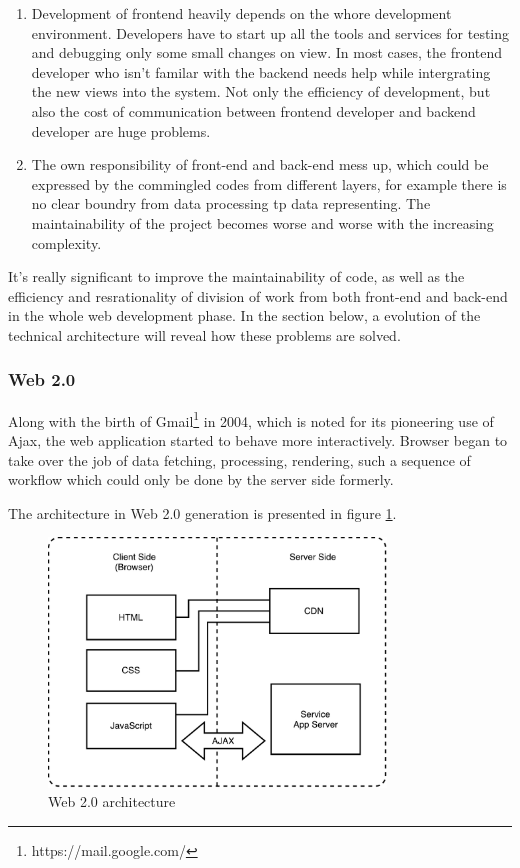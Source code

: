 \begin{enumerate}
\item
Development of frontend heavily depends on the whore development environment. Developers have to start up all the tools and services for testing and debugging only some small changes on view. In most cases, the frontend developer who isn't familar with the backend needs help while intergrating the new views into the system. Not only the efficiency of development, but also the cost of communication between frontend developer and backend developer are huge problems.
\item
The own responsibility of front-end and back-end mess up, which could be expressed by the commingled codes from different layers, for example there is no clear boundry from data processing tp data representing. The maintainability of the project becomes worse and worse with the increasing complexity.
\end{enumerate}

It's really significant to improve the maintainability of code, as well as the efficiency and resrationality of division of work from both front-end and back-end in the whole web development phase. In the section below, a evolution of the technical architecture will reveal how these problems are solved.

\subsubsection{Web 2.0}
Along with the birth of Gmail\footnote{https://mail.google.com/} in 2004, which is noted for its pioneering use of \gls{Ajax}, the web application started to behave more interactively. Browser began to take over the job of data fetching, processing, rendering, such a sequence of workflow which could only be done by the server side formerly.

The architecture in Web 2.0 generation is presented in figure \ref{fig:3.2}.

\begin{figure}[!htbp]
  \centering
    \includegraphics[width=0.8\textwidth]{Figures/tech-web-arch-2.pdf}
  \caption{Web 2.0 architecture}
  \label{fig:3.2}
\end{figure}

